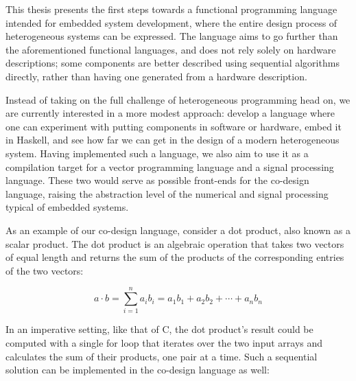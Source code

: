 \documentclass[../paper.tex]{subfiles}
\begin{document}
This thesis presents the first steps towards a functional programming language intended for embedded system development, where the entire design process of heterogeneous systems can be expressed. The language aims to go further than the aforementioned functional languages, and does not rely solely on hardware descriptions; some components are better described using sequential algorithms directly, rather than having one generated from a hardware description.

Instead of taking on the full challenge of heterogeneous programming head on, we are currently interested in a more modest approach: develop a language where one can experiment with putting components in software or hardware, embed it in Haskell, and see how far we can get in the design of a modern heterogeneous system. Having implemented such a language, we also aim to use it as a compilation target for a vector programming language and a signal processing language. These two would serve as possible front-ends for the co-design language, raising the abstraction level of the numerical and signal processing typical of embedded systems.


As an example of our co-design language, consider a dot product, also known as a scalar product. The dot product is an algebraic operation that takes two vectors of equal length and returns the sum of the products of the corresponding entries of the two vectors:

\begin{equation}
a \cdot b = \sum_{i=1}^{n}a_{i}b_{i} = a_{1}b_{1} + a_{2}b_{2} + \cdots + a_{n}b_{n}
\end{equation}


In an imperative setting, like that of C, the dot product's result could be computed with a single for loop that iterates over the two input arrays and calculates the sum of their products, one pair at a time. Such a sequential solution can be implemented in the co-design language as well:
\end{document}

